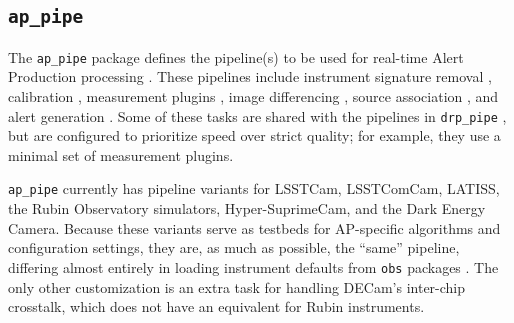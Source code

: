 \subsection{\texttt{ap\_pipe}}
\label{sec:ap_pipe}

The \texttt{ap\_pipe} package defines the pipeline(s) to be used for real-time Alert Production processing \citep{DMTN-219}.
These pipelines include instrument signature removal , calibration , measurement plugins , image differencing , source association , and alert generation .
Some of these tasks are shared with the pipelines in \texttt{drp\_pipe} , but are configured to prioritize speed over strict quality; for example, they use a minimal set of measurement plugins.

\texttt{ap\_pipe} currently has pipeline variants for LSSTCam, LSSTComCam, LATISS, the Rubin Observatory simulators, Hyper-SuprimeCam, and the Dark Energy Camera.
Because these variants serve as testbeds for AP-specific algorithms and configuration settings, they are, as much as possible, the ``same'' pipeline, differing almost entirely in loading instrument defaults from \texttt{obs} packages .
The only other customization is an extra task for handling DECam's inter-chip crosstalk, which does not have an equivalent for Rubin instruments.

